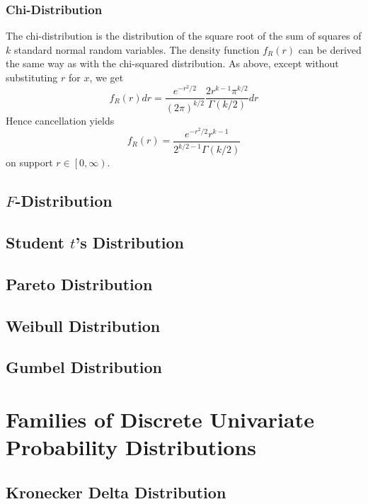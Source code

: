 \documentclass[11pt]{report} %
\begin{document}
\subsubsection{Chi-Distribution}

The chi-distribution is the distribution of the square root of the sum of squares of $k$ standard normal random variables. The density function $f_{R}\left(r\right)$ can be derived the same way as with the chi-squared distribution. As above, except without substituting $r$ for $x$, we get
\begin{equation}
f_{R}\left(r\right)dr = \dfrac{e^{-r^{2}/2}}{\left(2\pi\right)^{k/2}}\dfrac{2r^{k-1}\pi^{k/2}}{\Gamma\left(k/2\right)}dr
\end{equation}
Hence cancellation yields
\begin{equation}
f_{R}\left(r\right) = \dfrac{e^{-r^{2}/2}r^{k - 1}}{2^{k/2 - 1}\Gamma\left(k/2\right)}
\end{equation}
on support $r \in \left[0, \infty\right)$.

\subsection{$F$-Distribution}

\subsection{Student $t$'s Distribution}

\subsection{Pareto Distribution}

\subsection{Weibull Distribution}

\subsection{Gumbel Distribution}

\section{Families of Discrete Univariate Probability Distributions}

\subsection{Kronecker Delta Distribution}
\end{document}
